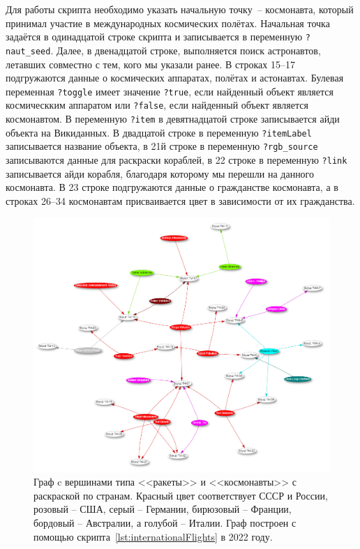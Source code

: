 Для работы скрипта необходимо указать начальную точку~-- космонавта, который принимал участие в международных космических полётах. Начальная точка задаётся в одинадцатой строке скрипта и записывается в переменную \lstinline{?naut_seed}. Далее, в двенадцатой строке, выполняется поиск астронавтов, летавших совместно с тем, кого мы указали ранее. В строках 15--17 подгружаются данные о космических аппаратах, полётах и астонавтах. Булевая переменная \lstinline|?toggle| имеет значение \lstinline|?true|, если найденный объект является космическким аппаратом или  \lstinline|?false|, если найденный объект является космонавтом. В переменную \lstinline|?item| в девятнадцатой строке записывается айди объекта на Викиданных. В двадцатой строке в переменную \lstinline|?itemLabel| записывается название объекта, в 21й строке в переменную \lstinline{?rgb_source} записываются данные для раскраски кораблей, в 22 строке в переменную \lstinline|?link| записывается айди корабля, благодаря которому мы перешли на данного космонавта. В 23 строке подгружаются данные о гражданстве  космонавта, а в строках 26--34 космонавтам присваивается цвет в зависимости от их гражданства. 

\begin{figure}[h]
  \includegraphics[width=\linewidth]{graphics/chapter/spacecraft_space_station/Cosmonauts in international flights.png}
  \caption[Граф c вершинами типа <<ракеты>> и <<космонавты>> с раскраской по странам]{Граф c вершинами типа <<ракеты>> и <<космонавты>> с раскраской по странам. Красный цвет соответствует СССР и России, розовый -- США, серый -- Германии, бирюзовый -- Франции, бордовый -- Австралии, а голубой -- Италии. Граф построен с помощью скрипта~\protect\ref{lst:internationalFlights} в 2022 году.}
  \label{fig:internationalFlights}%
\end{figure}

